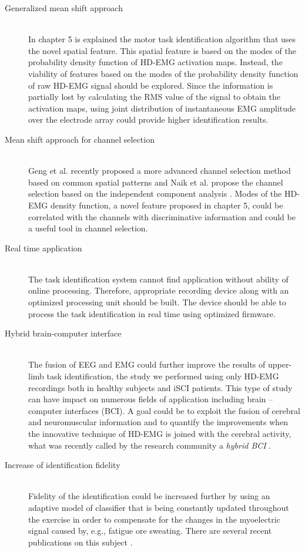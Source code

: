 \begin{description}
\item[Generalized mean shift approach] \hfill \\
	In chapter 5 is explained the motor task identification algorithm that uses the novel spatial feature. This spatial feature is based on the modes of the probability density function of HD-EMG activation maps. Instead, the viability of features based on the  modes of the probability density function of raw HD-EMG signal should be explored. Since the information is partially lost by calculating the RMS value of the signal to obtain the activation maps, using joint distribution of instantaneous EMG amplitude over the electrode array could provide higher identification results.
	
\item[Mean shift approach for channel selection] \hfill \\
	Geng et al. recently proposed a more advanced channel selection method based on common spatial patterns \citep{Geng2014} and Naik et al. propose the channel selection based on the independent component analysis \citep{Naik2016}. Modes of the HD-EMG density function, a novel feature proposed in chapter 5, could be correlated with the channels with discriminative information and could be a useful tool in channel selection.

\item[Real time application] \hfill \\
	The task identification system cannot find application without ability of online processing. Therefore, appropriate recording device along with an optimized processing unit should be built. The device should be able to process the task identification in real time using optimized firmware.

\item[Hybrid brain-computer interface] \hfill \\
	The fusion of EEG and EMG could further improve the results of upper-limb task identification, the study we performed using only HD-EMG recordings both in healthy subjects and iSCI patients. This type of study can have impact on numerous fields of application including brain – computer interfaces (BCI). A goal could be to exploit the fusion of cerebral and neuromuscular information and to quantify the improvements when the innovative technique of HD-EMG is joined with the cerebral activity, what was recently called by the research community a \emph{hybrid BCI} \citep{Muller-Putz2015, Rohm2013}.

\item [Increase of identification fidelity] \hfill \\
	Fidelity of the identification could be increased further by using an adaptive model of classifier that is being constantly updated throughout the exercise in order to compensate for the changes in the myoelectric signal caused by, e.g., fatigue ore sweating. There are several recent publications on this subject \citep{Hahne2015, Vidovic2016, Sensinger2009}.


\end{description}
